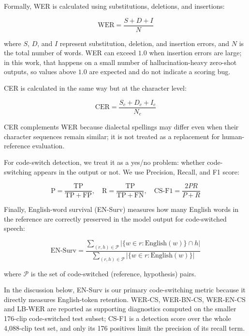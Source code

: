 \documentclass[journal]{IEEEtran}
\begin{document}
Formally, WER is calculated using substitutions, deletions, and insertions:

\begin{equation}
\text{WER} = \frac{S + D + I}{N}
\end{equation}

where $S$, $D$, and $I$ represent substitution, deletion, and insertion errors, and $N$ is the total number of words.
WER can exceed $1.0$ when insertion errors are large; in this work, that happens on a small number of hallucination-heavy zero-shot outputs, so values above $1.0$ are expected and do not indicate a scoring bug.

CER is calculated in the same way but at the character level:

\begin{equation}
\text{CER} = \frac{S_c + D_c + I_c}{N_c}
\end{equation}

CER complements WER because dialectal spellings may differ even when their character sequences remain similar; it is not treated as a replacement for human-reference evaluation.

For code-switch detection, we treat it as a yes/no problem: whether code-switching appears in the output or not. We use Precision, Recall, and F1 score:

\begin{equation}
\mathrm{P} = \frac{\mathrm{TP}}{\mathrm{TP} + \mathrm{FP}}, \quad
\mathrm{R} = \frac{\mathrm{TP}}{\mathrm{TP} + \mathrm{FN}}, \quad
\text{CS-F1} = \frac{2PR}{P + R}
\end{equation}

Finally, English-word survival (EN-Surv) measures how many English words in the reference are correctly preserved in the model output for code-switched speech:

\begin{equation}
\text{EN-Surv} =
\frac{\sum_{(r,h)\in\mathcal{P}} |\{w \in r : \mathrm{English}(w)\} \cap h|}
{\sum_{(r,h)\in\mathcal{P}} |\{w \in r : \mathrm{English}(w)\}|}
\end{equation}

where $\mathcal{P}$ is the set of code-switched (reference, hypothesis) pairs.

In the discussion below, EN-Surv is our primary code-switching metric because it directly measures English-token retention. WER-CS, WER-BN-CS, WER-EN-CS and LB-WER are reported as supporting diagnostics computed on the smaller 176-clip code-switched test subset; CS-F1 is a detection score over the whole 4{,}088-clip test set, and only its 176 positives limit the precision of its recall term.
\end{document}
